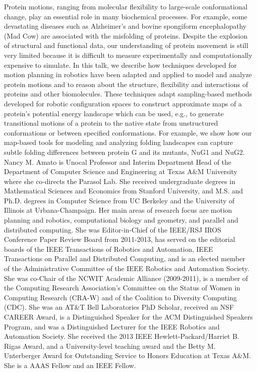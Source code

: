 {
Protein motions, ranging from molecular flexibility to large-scale conformational change, play an essential role in many biochemical processes. For example, some devastating diseases such as Alzheimer's and bovine spongiform encephalopathy (Mad Cow) are associated with the misfolding of proteins. Despite the explosion of structural and functional data, our understanding of protein movement is still very limited because it is difficult to measure experimentally and computationally expensive to simulate. In this talk, we describe how techniques developed for motion planning in robotics have been adapted and applied to model and analyze protein motions and to reason about the structure, flexibility and interactions of proteins and other biomolecules. These techniques adapt sampling-based methods developed for robotic configuration spaces to construct approximate maps of a protein's potential energy landscape which can be used, e.g., to generate transitional motions of a protein to the native state from unstructured conformations or between specified conformations. For example, we show how our map-based tools for modeling and analyzing folding landscapes can capture subtle folding differences between protein G and its mutants, NuG1 and NuG2.
}{
Nancy M. Amato is Unocal Professor and Interim Department Head of the Department of Computer Science and Engineering at Texas A\&M University where she co-directs the Parasol Lab. She received undergraduate degrees in Mathematical Sciences and Economics from Stanford University, and M.S. and Ph.D. degrees in Computer Science from UC Berkeley and the University of Illinois at Urbana-Champaign. Her main areas of research focus are motion planning and robotics, computational biology and geometry, and parallel and distributed computing. She was Editor-in-Chief of the IEEE/RSJ IROS Conference Paper Review Board from 2011-2013, has served on the editorial boards of the IEEE Transactions of Robotics and Automation, IEEE Transactions on Parallel and Distributed Computing, and is an elected member of the Administrative Committee of the IEEE Robotics and Automation Society. She was co-Chair of the NCWIT Academic Alliance (2009-2011), is a member of the Computing Research Association's Committee on the Status of Women in Computing Research (CRA-W) and of the Coalition to Diversity Computing (CDC). She was an AT\&T Bell Laboratories PhD Scholar, received an NSF CAREER Award, is a Distinguished Speaker for the ACM Distinguished Speakers Program, and was a Distinguished Lecturer for the IEEE Robotics and Automation Society. She received the 2013 IEEE Hewlett-Packard/Harriet B. Rigas Award, and a University-level teaching award and the Betty M. Unterberger Award for Outstanding Service to Honors Education at Texas A\&M. She is a AAAS Fellow and an IEEE Fellow.
}


